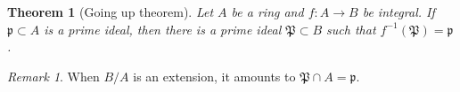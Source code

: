 \documentclass[12pt]{report}
\theoremstyle{plain}
\newtheorem{theorem}{Theorem}[section]
\theoremstyle{remark}
\newtheorem*{remark}{Remark}
\theoremstyle{definition}
\begin{document}
\begin{theorem}[Going up theorem]
    Let $A$ be a ring and $f:A\to B$ be integral. If $\mathfrak{p}\subset A$ is a prime ideal, then there is a prime ideal $\mathfrak{P}\subset B$ such that $f^{-1}(\mathfrak{P})=\mathfrak{p}$.
\end{theorem}
\begin{remark}
     When $B/A$ is an extension, it amounts to $\mathfrak{P}\cap A=\mathfrak{p}$.
     \begin{figure}[H]
         \centering
     \end{figure}
\end{remark}
\end{document}
